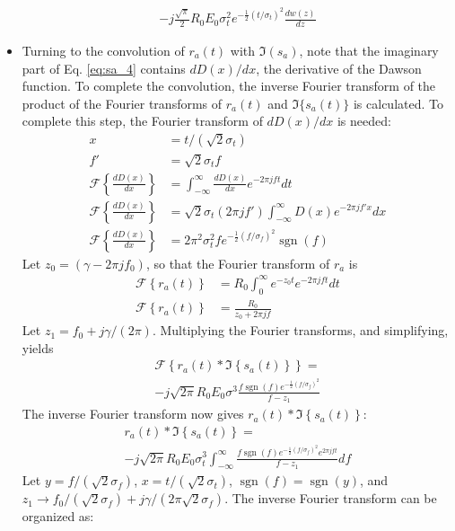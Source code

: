 \documentclass[amsmath,amssymb,aps,prd,10pt,twocolumn,showkeys]{revtex4}
\DeclareMathOperator{\sgn}{sgn}
\begin{document}
\begin{itemize}
\begin{multline}
-j\frac{\sqrt{\pi}}{2} R_0 E_0 \sigma_t^2 e^{-\frac{1}{2}(t/\sigma_t)^2} \frac{dw(z)}{dz} \label{eq:Re_result}
\end{multline}
\item Turning to the convolution of $r_a(t)$ with $\Im(s_a)$, note that the imaginary part of Eq. \ref{eq:sa_4} contains $dD(x)/dx$, the derivative of the Dawson function.  To complete the convolution, the inverse Fourier transform of the product of the Fourier transforms of $r_a(t)$ and $\Im\lbrace s_a(t)\rbrace$ is calculated.  To complete this step, the Fourier transform of $dD(x)/dx$ is needed:
\begin{align}
x &= t/(\sqrt{2}\sigma_t) \\
f' &= \sqrt{2} \sigma_t f \\
\mathcal{F}\left\lbrace \frac{dD(x)}{dx}\right\rbrace &= \int_{-\infty}^{\infty} \frac{dD(x)}{dx}e^{-2\pi jft} dt \\
\mathcal{F}\left\lbrace \frac{dD(x)}{dx}\right\rbrace &= \sqrt{2}\sigma_t(2\pi jf') \int_{-\infty}^{\infty} D(x) e^{-2\pi jf'x} dx \\
\mathcal{F}\left\lbrace \frac{dD(x)}{dx}\right\rbrace &= 2\pi^2 \sigma_t^2 f e^{-\frac{1}{2}(f/\sigma_f)^2} \sgn(f)
\end{align}
Let $z_0 = (\gamma - 2\pi jf_0)$, so that the Fourier transform of $r_a$ is 
\begin{align}
\mathcal{F}\left\lbrace r_a(t)\right\rbrace &= R_0\int_{0}^{\infty} e^{-z_0 t} e^{-2\pi j ft} dt \\
\mathcal{F}\left\lbrace r_a(t)\right\rbrace &= \frac{R_0}{z_0+2\pi j f}
\end{align}
Let $z_1 = f_0 + j\gamma/(2\pi)$. Multiplying the Fourier transforms, and simplifying, yields
\begin{multline}
\mathcal{F}\left\lbrace r_a(t) * \Im\left\lbrace s_a(t)\right\rbrace \right\rbrace = \\ -j \sqrt{2\pi} R_0 E_0 \sigma^3 \frac{f\sgn(f) e^{-\frac{1}{2}(f/\sigma_f)^2}}{f-z_1}
\end{multline}
The inverse Fourier transform now gives $r_a(t) * \Im\left\lbrace s_a(t) \right\rbrace$:
\begin{multline}
r_a(t) * \Im\left\lbrace s_a(t) \right\rbrace = \\
-j\sqrt{2\pi} R_0 E_0 \sigma_t^3 \int_{-\infty}^{\infty} \frac{f\sgn(f)e^{-\frac{1}{2}(f/\sigma_f)^2}e^{2\pi jft}}{f-z_1} df
\end{multline}
Let $y = f/(\sqrt{2}\sigma_f)$, $x=t/(\sqrt{2}\sigma_t)$, $\sgn(f) = \sgn(y)$, and $z_1 \to f_0/(\sqrt{2}\sigma_f) + j\gamma/(2\pi \sqrt{2} \sigma_f)$.  The inverse Fourier transform can be organized as:

\end{itemize}
\end{document}
